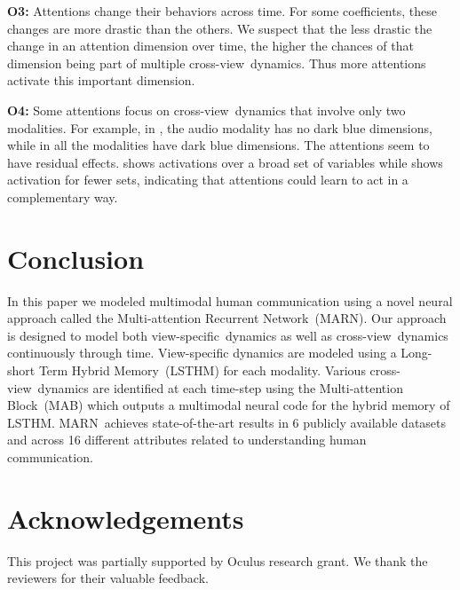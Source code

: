 \documentclass[letterpaper]{article} \usepackage{aaai18}  \usepackage{times}  \usepackage{helvet}  \usepackage{courier}  \usepackage{url}  \usepackage{graphicx}  \usepackage{multirow}
\newcommand{\pipeline}{Multi-attention Recurrent Network}
\newcommand{\pipelines}{MARN}
\newcommand{\mab}{Multi-attention Block}
\newcommand{\mabs}{MAB}
\newcommand{\intra}{view-specific}
\newcommand{\inter}{cross-view}
\newcommand{\tname}{Long-short Term Hybrid Memory}
\newcommand{\tnames}{LSTHM}
\begin{document}
\textbf{O3:} Attentions change their behaviors across time. For some coefficients, these changes are more drastic than the others. We suspect that the less drastic the change in an attention dimension over time, the higher the chances of that dimension being part of multiple \inter \ dynamics. Thus more attentions activate this important dimension.

\textbf{O4:} Some attentions focus on \inter \ dynamics that involve only two modalities. For example, in , the audio modality has no dark blue dimensions, while in  all the modalities have dark blue dimensions. The attentions seem to have residual effects.  shows activations over a broad set of variables while  shows activation for fewer sets, indicating that attentions could learn to act in a complementary way.


\section{Conclusion}
In this paper we modeled multimodal human communication using a novel neural approach called the \pipeline \ (\pipelines). Our approach is designed to model both \intra \ dynamics as well as \inter \ dynamics continuously through time. View-specific dynamics are modeled using a \tname \ (\tnames) for each modality. Various \inter \ dynamics are identified at each time-step using the \mab \ (\mabs) which outputs a multimodal neural code for the hybrid memory of \tnames. \pipelines \ achieves state-of-the-art results in 6 publicly available datasets and across 16 different attributes related to understanding human communication.

\section{Acknowledgements}
This project was partially supported by Oculus research grant. We thank the reviewers for their valuable feedback.






{\small}
\end{document}
